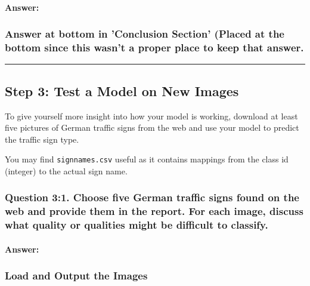 \documentclass[11pt]{article}
\begin{document}
    \paragraph{Answer:}\label{answer}

\subsubsection{Answer at bottom in 'Conclusion Section' (Placed at the
bottom since this wasn't a proper place to keep that
answer.}\label{answer-at-bottom-in-conclusion-section-placed-at-the-bottom-since-this-wasnt-a-proper-place-to-keep-that-answer.}

    \begin{center}\rule{0.5\linewidth}{\linethickness}\end{center}

\subsection{Step 3: Test a Model on New
Images}\label{step-3-test-a-model-on-new-images}

To give yourself more insight into how your model is working, download
at least five pictures of German traffic signs from the web and use your
model to predict the traffic sign type.

You may find \texttt{signnames.csv} useful as it contains mappings from
the class id (integer) to the actual sign name.

    \subsubsection{Question 3:1. Choose five German traffic signs found on
the web and provide them in the report. For each image, discuss what
quality or qualities might be difficult to
classify.}\label{question-31.-choose-five-german-traffic-signs-found-on-the-web-and-provide-them-in-the-report.-for-each-image-discuss-what-quality-or-qualities-might-be-difficult-to-classify.}

    \paragraph{Answer:}\label{answer}

    \subsubsection{Load and Output the
Images}\label{load-and-output-the-images}
\end{document}
